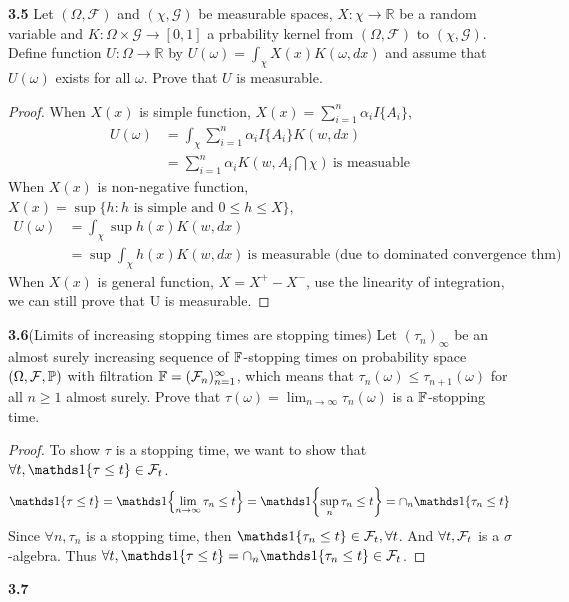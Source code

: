 \noindent\textbf{3.5}
Let $(\Omega, \mathcal{F})$ and $(\chi,\mathcal{G})$ be measurable spaces, $X: \chi \to \mathbb{R}$ be a random variable and $K: \Omega\times \mathcal{G} \to [0,1]$ a prbability kernel from $(\Omega, \mathcal{F})$ to $(\chi,\mathcal{G})$. Define function $U:\Omega \to \mathbb{R}$ by $U(\omega) = \int_\chi X(x) K(\omega,dx)$ and assume that $U(\omega)$ exists for all $\omega$. Prove that $U$ is measurable. 
\begin{proof}
    When $X(x)$ is simple function, $X(x) = \sum_{i = 1}^n \alpha_i I\{A_i\}$,
    \begin{equation}
        \begin{aligned}
            U(\omega) &= \int_\chi \sum_{i = 1}^n \alpha_i I\{A_i\} K(w,dx)\\
            &= \sum_{i = 1}^n \alpha_i K(w,A_i\bigcap\chi)\ \text{is measuable}
        \end{aligned}
    \end{equation}
    When $X(x)$ is non-negative function, $X(x) = \sup \{h: h \text{ is simple and } 0\leq h \leq X\}$, 
    \begin{equation}
        \begin{aligned}
            U(\omega) &= \int_\chi \sup h(x) K(w,dx)\\
            & = \sup \int_\chi h(x) K(w,dx) \ \text{is measurable (due to dominated convergence thm)} 
        \end{aligned}
    \end{equation}
    When $X(x)$ is general function, $X = X^+ - X^-$, use the linearity of integration, we can still prove that U is measurable. 
\end{proof}



\noindent\textbf{3.6}(Limits of increasing stopping times are stopping times) Let $(\tau_n)_{\infty}$ be an almost surely increasing sequence of $\mathbb{F}$-stopping times on probability space $(\Omega,\mathcal{F},\mathbb{P})$ with filtration $\mathbb{F} = (\mathcal{F}_n)_{n=1}^{\infty}$, which means that $\tau_n(\omega) \le \tau_{n+1}(\omega)$ for all $n\ge 1$ almost surely. Prove that $\tau(\omega)=\lim_{n\to \infty}\tau_n(\omega)$ is a $\mathbb{F}$-stopping time. 

\begin{proof}
    To show $\tau$ is a stopping time, we want to show that $\forall t, \bOne{\tau \le t} \in \cF_t$. 
    \begin{align*}
        \bOne{\tau \le t} = \bOne{\lim_{n\to \infty}\tau_n \le t} = \bOne{\sup_n \tau_n \le t}   = \cap_n \bOne{\tau_n \le t} 
    \end{align*}
    Since $\forall n, \tau_n$ is a stopping time, then $\bOne{\tau_n\le t} \in \cF_t,\forall t$. And $\forall t, \mathcal{F}_t$ is a $\sigma$-algebra. Thus $\forall t, \bOne{\tau \le t} = \cap_n \bOne{\tau_n \le t}  \in \cF_t$. 
\end{proof}


\noindent\textbf{3.7}